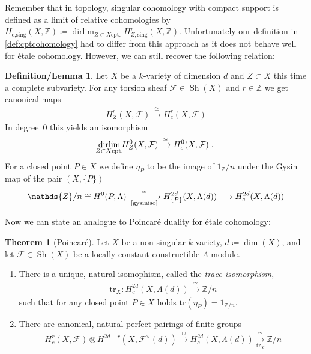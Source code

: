 \documentclass[english]{scrartcl}
\theoremstyle{definition}
\newtheorem{DefLem}[Def]{Definition/Lemma}
\newtheorem{Thm}[Def]{Theorem}
\theoremstyle{remark}
\newcommand*{\Z}{\mathds{Z}}
\newcommand*{\Zmod}[1]{\Z/#1} %
\newcommand*{\F}{\mathcal{F}} %
\DeclareMathOperator*{\dirlim}{dirlim} %
\DeclareMathOperator{\Sh}{Sh} %
\newcommand*{\Tr}{\text{tr}} %
\newcommand*{\tr}[1]{\Tr\left(#1\right)} %
\begin{document}
Remember that in topology, singular cohomology with compact support is
defined as a limit of relative cohomologies by
$H_{\text{c,sing}}(X,\Z)\coloneqq
\dirlim_{Z\subset X \text{cpt.}}H_{Z,\text{sing}}^r(X,\Z)$.
Unfortunately our definition in \ref{def:cptcohomology} had to differ from
this approach as it does not behave well for étale cohomology.
However, we can still recover the following relation:
\begin{DefLem}\label{def:etapoint}
  Let $X$ be a $k$-variety of dimension $d$ and $Z\subset X$ this time
  a complete subvariety. For any torsion sheaf $\F\in\Sh(X)$ and
  $r\in\Z$ we get canonical maps
  \begin{gather*}
    H_Z^r(X,\F)\xrightarrow{\cong} H_c^r(X,\F)
  \end{gather*}
  In degree~0 this yields an isomorphism
  \begin{gather*}
    \dirlim_{\mathclap{Z\subset X \text{cpt.}}} H_Z^0(X,\F) 
    \xrightarrow{\cong} H_c^0(X,\F)\;.
  \end{gather*}
  For a closed point $P\in X$ we define $\eta_P$ to be the image of
  $1_\Zmod{n}$ under the Gysin map of the pair $(X,\{P\})$
  \begin{gather*}
    \Zmod{n}
    \cong H^0(P,\Lambda)
    \xrightarrow[\text{\ref{gysiniso}}]{\cong}
    H_{\{P\}}^{2d}(X,\Lambda(d))
    \longrightarrow H_c^{2d}(X,\Lambda(d))
  \end{gather*}
\end{DefLem}

Now we can state an analogue to Poincaré duality for étale cohomology:
\begin{Thm}[Poincaré]\label{poincare}
  Let $X$ be a non-singular $k$-variety,
  $d\coloneqq\dim(X)$,
  and let $\F\in\Sh(X)$ be a locally constant constructible
  $\Lambda$-module.
  \begin{enumerate}
  \item There is a unique, natural isomophism,
    called the \emph{trace isomorphism},
    \begin{gather*}
      \Tr_X\colon H_c^{2d}(X,\Lambda(d)) \xrightarrow{\cong} \Zmod{n}
    \end{gather*}
    such that for any closed point $P\in X$ holds
    $\tr{\eta_P}=1_{\Zmod{n}}$.
  \item There are canonical, natural perfect pairings of finite groups
    \begin{gather*}
      H_c^r(X,\F) \otimes H^{2d-r}\left(X,\F^\vee(d)\right)
      \overset\cup\longrightarrow H_c^{2d}(X,\Lambda(d))
      \xrightarrow[\Tr_X]{\cong} \Zmod{n}
    \end{gather*}
  \end{enumerate}
\end{Thm}
\end{document}

